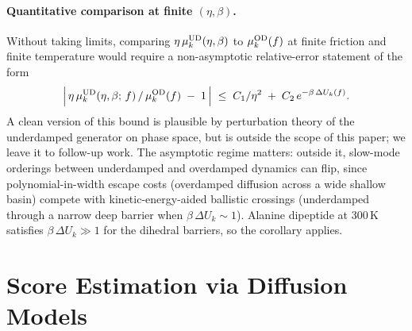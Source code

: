 \documentclass{article}
\newcommand{\E}{\mathbb{E}}
\begin{document}
\paragraph{Quantitative comparison at finite $(\eta, \beta)$.}
Without taking limits, comparing $\eta\,\mu_k^{\rm UD}(\eta, \beta)$ to $\mu_k^{\rm OD}(f)$ at finite friction and finite temperature would require a non-asymptotic relative-error statement of the form
\[
\Bigl|\,\eta\,\mu_k^{\rm UD}(\eta, \beta;\, f) \,/\, \mu_k^{\rm OD}(f) \;-\; 1\,\Bigr| \;\le\; C_1/\eta^2 \;+\; C_2\,e^{-\beta\,\Delta U_k(f)}.
\]
A clean version of this bound is plausible by perturbation theory of the underdamped generator on phase space, but is outside the scope of this paper; we leave it to follow-up work. The asymptotic regime matters: outside it, slow-mode orderings between underdamped and overdamped dynamics can flip, since polynomial-in-width escape costs (overdamped diffusion across a wide shallow basin) compete with kinetic-energy-aided ballistic crossings (underdamped through a narrow deep barrier when $\beta\,\Delta U_k \sim 1$). Alanine dipeptide at 300\,K satisfies $\beta\,\Delta U_k \gg 1$ for the dihedral barriers, so the corollary applies.




\section{Score Estimation via Diffusion Models}
\label{app:tweedie}


\end{document}
